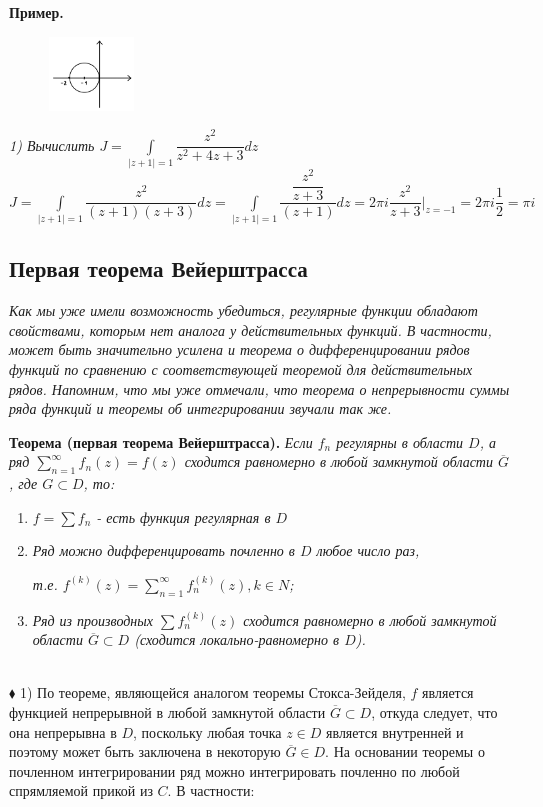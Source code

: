 \documentclass[a4paper, 12pt]{report}
\begin{document}
\par\bigskip
\textbf{Пример. } \quad
\begin{figure} 
    \vspace{-5ex}
    \includegraphics[width=0.2\textwidth]{luivill.png}
\end{figure}
\textit{1) Вычислить $J = \int\limits_{|z+1|=1}\dfrac{z^2}{z^2 + 4z + 3}dz$}
\\
$J = \int\limits_{|z+1|=1}\dfrac{z^2}{(z + 1)(z + 3)}dz = \int\limits_{|z+1|=1}\dfrac{\dfrac{z^2}{z + 3}}{(z + 1)}dz = 2\pi i \dfrac{z^2}{z + 3}\bigg|_{z = -1} = 2\pi i \dfrac{1}{2} = \pi i$




\subsection{Первая теорема Вейерштрасса}

\textit{Как мы уже имели возможность убедиться, регулярные функции обладают свойствами, которым нет аналога у действительных функций. В частности, может быть значительно усилена и теорема о дифференцировании рядов функций по сравнению с соответствующей теоремой для действительных рядов. Напомним, что мы уже отмечали, что теорема о непрерывности суммы ряда функций и теоремы об интегрировании звучали так же.}
\par\bigskip
 \textbf{Теорема (первая теорема Вейерштрасса).}\quad
\textit{Если $f_n$ регулярны в области $D$, а ряд $\sum\limits_{n=1}^{\infty} f_n(z) = f(z)$ сходится равномерно в любой замкнутой области $\overline{G}$, где $G \subset D$, то:}
\begin{enumerate}
    \item \textit{$f = \sum f_n$ - есть функция регулярная в $D$}
    \item \textit{Ряд можно дифференцировать почленно в $D$ любое число раз,} \par \textit{т.е. $f^{(k)}(z) = \sum\limits_{n=1}^{\infty}f_n^{(k)}(z), k \in N$;}
    \item \textit{Ряд из производных $\sum f_n^{(k)}(z)$ сходится равномерно в любой замкнутой области $\overline{G} \subset D$ (сходится локально-равномерно в $D$).}
\end{enumerate} \\
$\blacklozenge$ 1) По теореме, являющейся аналогом теоремы Стокса-Зейделя, $f$ является функцией непрерывной в любой замкнутой области $\overline{G} \subset D$, откуда следует, что она непрерывна в $D$, поскольку любая точка $z \in D$ является внутренней и поэтому может быть заключена в некоторую $\overline{G} \in D$. На основании теоремы о почленном интегрировании ряд можно интегрировать почленно по любой спрямляемой прикой из $C$. В частности:
\end{document}
